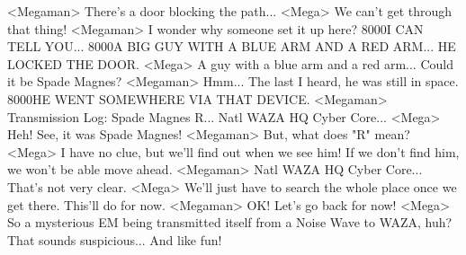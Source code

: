 <Megaman> There's a door blocking the path... 
<Mega> We can't get through that thing! 
<Megaman> I wonder why someone set it up here? 
{80}{00}I CAN TELL YOU... 
{80}{00}A BIG GUY WITH A BLUE ARM AND A RED ARM... 
HE LOCKED THE DOOR. 
<Mega> A guy with a blue arm and a red arm... Could it be Spade Magnes? 
<Megaman> Hmm... The last I heard, he was still in space. 
{80}{00}HE WENT SOMEWHERE VIA THAT DEVICE. 
<Megaman> Transmission Log: Spade Magnes R... Natl WAZA HQ Cyber Core... 
<Mega> Heh! See, it was Spade Magnes! 
<Megaman> But, what does "R" mean? 
<Mega> I have no clue, but we'll find out when we see him! 
If we don't find him, we won't be able move ahead. 
<Megaman> Natl WAZA HQ Cyber Core... That's not very clear. 
<Mega> We'll just have to search the whole place once we get there. This'll do for now. 
<Megaman> OK! Let's go back for now! 
<Mega> So a mysterious EM being transmitted itself from a Noise Wave to WAZA, huh? 
That sounds suspicious... And like fun! 
